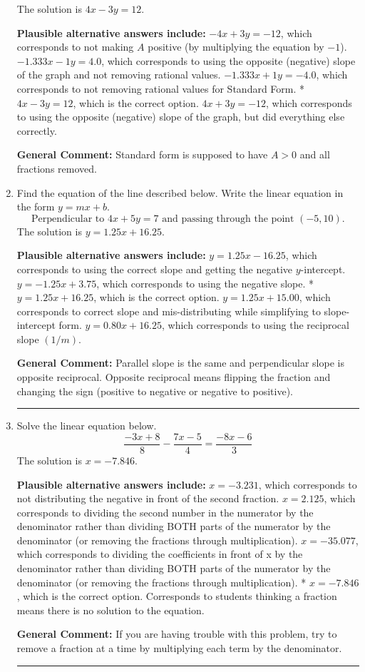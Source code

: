 \documentclass{extbook}[14pt]
\newcommand{\litem}[1]{\item #1

\rule{\textwidth}{0.4pt}}
\begin{document}
\begin{enumerate}
{The solution is \( 4x - 3y = 12 \).\begin{enumerate}[label=\Alph*.]
\textbf{Plausible alternative answers include:} $-4x + 3y = -12$, which corresponds to not making $A$ positive (by multiplying the equation by $-1$).
 $-1.333x - 1y = 4.0$, which corresponds to using the opposite (negative) slope of the graph and not removing rational values.
 $-1.333x + 1y = -4.0$, which corresponds to not removing rational values for Standard Form.
* $4x - 3y = 12$, which is the correct option.
 $4x + 3y = -12$, which corresponds to using the opposite (negative) slope of the graph, but did everything else correctly.
\end{enumerate}

\textbf{General Comment:} Standard form is supposed to have $A > 0$ and all fractions removed.
}
\litem{
Find the equation of the line described below. Write the linear equation in the form $y=mx+b$.
\[ \text{Perpendicular to } 4 x + 5 y = 7 \text{ and passing through the point } (-5, 10). \]The solution is \( y = 1.25x + 16.25 \).\begin{enumerate}[label=\Alph*.]
\textbf{Plausible alternative answers include:} $y = 1.25x - 16.25$, which corresponds to using the correct slope and getting the negative $y$-intercept.
 $y = -1.25x + 3.75$, which corresponds to using the negative slope.
* $y = 1.25x + 16.25$, which is the correct option.
 $y = 1.25x + 15.00$, which corresponds to correct slope and mis-distributing while simplifying to slope-intercept form.
 $y = 0.80x + 16.25$, which corresponds to using the reciprocal slope $(1/m)$.
\end{enumerate}

\textbf{General Comment:} Parallel slope is the same and perpendicular slope is opposite reciprocal. Opposite reciprocal means flipping the fraction and changing the sign (positive to negative or negative to positive).
}
\litem{
Solve the linear equation below.
\[ \frac{-3x + 8}{8} - \frac{7x -5}{4} = \frac{-8x -6}{3} \]The solution is \( x = -7.846 \).\begin{enumerate}[label=\Alph*.]
\textbf{Plausible alternative answers include:} $x = -3.231$, which corresponds to not distributing the negative in front of the second fraction.
 $x = 2.125$, which corresponds to dividing the second number in the numerator by the denominator rather than dividing BOTH parts of the numerator by the denominator (or removing the fractions through multiplication).
 $x = -35.077$, which corresponds to dividing the coefficients in front of x by the denominator rather than dividing BOTH parts of the numerator by the denominator (or removing the fractions through multiplication).
* $x = -7.846$, which is the correct option.
Corresponds to students thinking a fraction means there is no solution to the equation.
\end{enumerate}

\textbf{General Comment:} If you are having trouble with this problem, try to remove a fraction at a time by multiplying each term by the denominator.
}
\end{enumerate}
\end{document}
